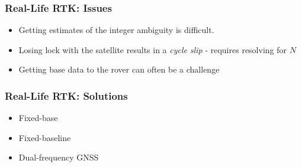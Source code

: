 \documentclass{beamer}
\begin{document}
\begin{frame}\frametitle{Real-Life RTK: Issues}
\begin{itemize}
	\item Getting estimates of the integer ambiguity is difficult.
	\item Losing lock with the satellite results in a \emph{cycle slip} - requires resolving for $N$
	\item Getting base data to the rover can often be a challenge
\end{itemize}
\end{frame}

\begin{frame}[t]\frametitle{Real-Life RTK: Solutions}    
\begin{itemize}
	\item Fixed-base
	\item Fixed-baseline
	\item Dual-frequency GNSS
\end{itemize}
	

\end{frame}
\end{document}
